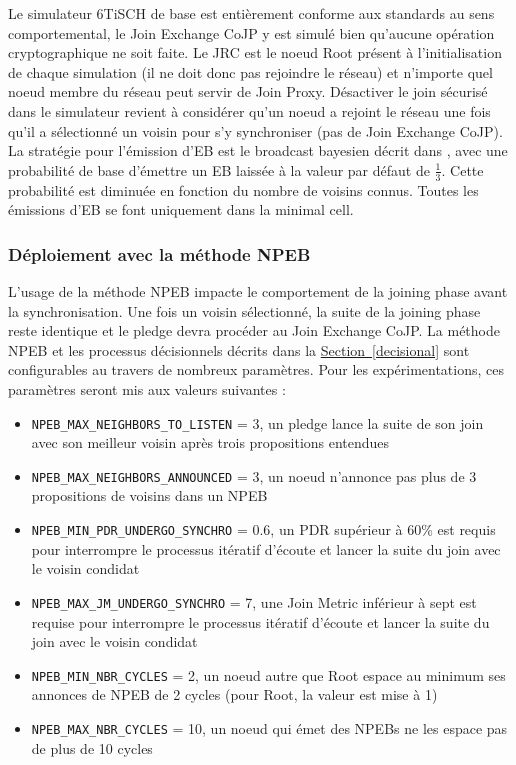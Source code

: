 \documentclass[]{report}
\newcommand{\wordlink}[2]{\hyperref[#2]{#1~\ref{#2}}}
\begin{document}
Le simulateur 6TiSCH de base est entièrement conforme aux standards au sens comportemental, le Join Exchange CoJP y est simulé bien qu'aucune opération cryptographique ne soit faite. Le JRC est le noeud Root présent à l'initialisation de chaque simulation (il ne doit donc pas rejoindre le réseau) et n'importe quel noeud membre du réseau peut servir de Join Proxy. Désactiver le join sécurisé dans le simulateur revient à considérer qu'un noeud a rejoint le réseau une fois qu'il a sélectionné un voisin pour s'y synchroniser (pas de Join Exchange CoJP).\\

La stratégie pour l'émission d'EB est le broadcast bayesien décrit dans \cite{broadcast-strategies}, avec une probabilité de base d'émettre un EB laissée à la valeur par défaut de $\frac{1}{3}$. Cette probabilité est diminuée en fonction du nombre de voisins connus. Toutes les émissions d'EB se font uniquement dans la minimal cell. 

\subsubsection{Déploiement avec la méthode NPEB}

L'usage de la méthode NPEB impacte le comportement de la joining phase avant la synchronisation. Une fois un voisin sélectionné, la suite de la joining phase reste identique et le pledge devra procéder au Join Exchange CoJP. La méthode NPEB et les processus décisionnels décrits dans la \wordlink{Section}{decisional} sont configurables au travers de nombreux paramètres. Pour les expérimentations, ces paramètres seront mis aux valeurs suivantes :

\begin{itemize}[label=$\bullet$]
\item \texttt{NPEB\_MAX\_NEIGHBORS\_TO\_LISTEN} = 3, un pledge lance la suite de son join avec son meilleur voisin après trois propositions entendues
\vspace{0.1cm}
\item \texttt{NPEB\_MAX\_NEIGHBORS\_ANNOUNCED} = 3, un noeud n'annonce pas plus de 3 propositions de voisins dans un NPEB
\vspace{0.1cm}
\item \texttt{NPEB\_MIN\_PDR\_UNDERGO\_SYNCHRO} = 0.6, un PDR supérieur à 60\% est requis pour interrompre le processus itératif d'écoute et lancer la suite du join avec le voisin condidat
\vspace{0.1cm}
\item \texttt{NPEB\_MAX\_JM\_UNDERGO\_SYNCHRO} = 7, une Join Metric inférieur à sept est requise pour interrompre le processus itératif d'écoute et lancer la suite du join avec le voisin condidat 
\vspace{0.1cm}
\item \texttt{NPEB\_MIN\_NBR\_CYCLES} = 2, un noeud autre que Root espace au minimum ses annonces de NPEB de 2 cycles (pour Root, la valeur est mise à 1)
\vspace{0.1cm}
\item \texttt{NPEB\_MAX\_NBR\_CYCLES} = 10, un noeud qui émet des NPEBs ne les espace pas de plus de 10 cycles
\end{itemize}
\end{document}
